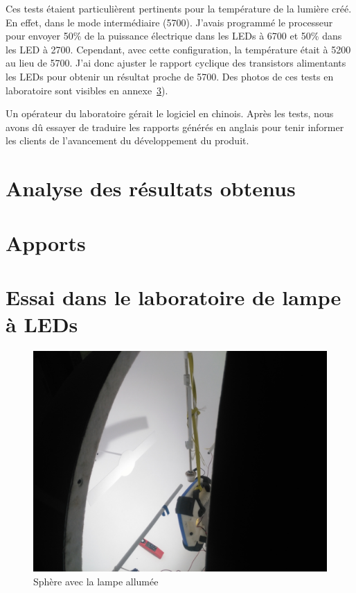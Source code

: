 \documentclass[a4paper, 11pt]{report}
\begin{document}
Ces tests étaient particulièrent pertinents pour la température de la lumière créé. En effet, dans le mode intermédiaire (\unit{5700}{\kelvin}). J'avais programmé le processeur pour envoyer 50\% de la puissance électrique dans les LEDs à \unit{6700}{\kelvin} et 50\% dans les LED à \unit{2700}{\kelvin}. Cependant, avec cette configuration, la température était à \unit{5200}{\kelvin} au lieu de \unit{5700}{\kelvin}. J'ai donc ajuster le rapport cyclique des transistors alimentants les LEDs pour obtenir un résultat proche de \unit{5700}{\kelvin}. Des photos de ces tests en laboratoire sont visibles en annexe~\ref{cha:labo_pictures}).

Un opérateur du laboratoire gérait le logiciel en chinois. Après les tests, nous avons dû essayer de traduire les rapports générés en anglais pour tenir informer les clients de l'avancement du développement du produit.  


\chapter{Analyse des résultats obtenus}

\chapter{Apports}



\appendix

\chapter{Essai dans le laboratoire de lampe à LEDs}
\label{cha:labo_pictures}

\begin{figure}[!h]
\begin{center}
\includegraphics[scale=0.1]{figures/photos/tests_worklamp/sphere/sphere_allumee.jpg}
\end{center}
\caption{Sphère avec la lampe allumée} 
\label{fig:lamp_on}
\end{figure}

\listoffigures



\end{document}
